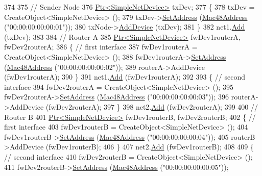 \begin{DoxyCode}
374 
375   \textcolor{comment}{// Sender Node}
376   \hyperlink{classns3_1_1Ptr}{Ptr<SimpleNetDevice>} txDev;
377   \{
378     txDev = CreateObject<SimpleNetDevice> ();
379     txDev->\hyperlink{classns3_1_1SimpleNetDevice_a968ef3e7318bac29d5f1d7d977029af4}{SetAddress} (\hyperlink{classns3_1_1Mac48Address}{Mac48Address} (\textcolor{stringliteral}{"00:00:00:00:00:01"}));
380     txNode->\hyperlink{classns3_1_1Node_a42ff83ee1d5d1649c770d3f5b62375de}{AddDevice} (txDev);
381   \}
382   net1.\hyperlink{classns3_1_1NetDeviceContainer_a7ca8bc1d7ec00fd4fcc63869987fbda5}{Add} (txDev);
383 
384   \textcolor{comment}{// Router A}
385   \hyperlink{classns3_1_1Ptr}{Ptr<SimpleNetDevice>} fwDev1routerA, fwDev2routerA;
386   \{ \textcolor{comment}{// first interface}
387     fwDev1routerA = CreateObject<SimpleNetDevice> ();
388     fwDev1routerA->\hyperlink{classns3_1_1SimpleNetDevice_a968ef3e7318bac29d5f1d7d977029af4}{SetAddress} (\hyperlink{classns3_1_1Mac48Address}{Mac48Address} (\textcolor{stringliteral}{"00:00:00:00:00:02"}));
389     routerA->AddDevice (fwDev1routerA);
390   \}
391   net1.\hyperlink{classns3_1_1NetDeviceContainer_a7ca8bc1d7ec00fd4fcc63869987fbda5}{Add} (fwDev1routerA);
392 
393   \{ \textcolor{comment}{// second interface}
394     fwDev2routerA = CreateObject<SimpleNetDevice> ();
395     fwDev2routerA->\hyperlink{classns3_1_1SimpleNetDevice_a968ef3e7318bac29d5f1d7d977029af4}{SetAddress} (\hyperlink{classns3_1_1Mac48Address}{Mac48Address} (\textcolor{stringliteral}{"00:00:00:00:00:03"}));
396     routerA->AddDevice (fwDev2routerA);
397   \}
398   net2.\hyperlink{classns3_1_1NetDeviceContainer_a7ca8bc1d7ec00fd4fcc63869987fbda5}{Add} (fwDev2routerA);
399 
400   \textcolor{comment}{// Router B}
401   \hyperlink{classns3_1_1Ptr}{Ptr<SimpleNetDevice>} fwDev1routerB, fwDev2routerB;
402   \{ \textcolor{comment}{// first interface}
403     fwDev1routerB = CreateObject<SimpleNetDevice> ();
404     fwDev1routerB->\hyperlink{classns3_1_1SimpleNetDevice_a968ef3e7318bac29d5f1d7d977029af4}{SetAddress} (\hyperlink{classns3_1_1Mac48Address}{Mac48Address} (\textcolor{stringliteral}{"00:00:00:00:00:04"}));
405     routerB->AddDevice (fwDev1routerB);
406   \}
407   net2.\hyperlink{classns3_1_1NetDeviceContainer_a7ca8bc1d7ec00fd4fcc63869987fbda5}{Add} (fwDev1routerB);
408 
409   \{ \textcolor{comment}{// second interface}
410     fwDev2routerB = CreateObject<SimpleNetDevice> ();
411     fwDev2routerB->\hyperlink{classns3_1_1SimpleNetDevice_a968ef3e7318bac29d5f1d7d977029af4}{SetAddress} (\hyperlink{classns3_1_1Mac48Address}{Mac48Address} (\textcolor{stringliteral}{"00:00:00:00:00:05"}));

\end{DoxyCode}
